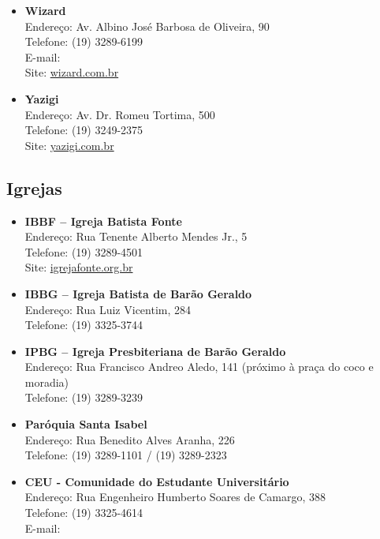 \begin{itemize}
\item \textbf{Wizard}
  \\Endereço: Av. Albino José Barbosa de Oliveira, 90
  \\Telefone: (19) 3289-6199
  \\E-mail: 
  \\Site: \url{wizard.com.br}

\item \textbf{Yazigi}
  \\Endereço: Av. Dr. Romeu Tortima, 500
  \\Telefone: (19) 3249-2375
  \\Site: \url{yazigi.com.br}
\end{itemize}

\subsection{Igrejas}

\begin{itemize}
\item \textbf{IBBF -- Igreja Batista Fonte}
  \\Endereço: Rua Tenente Alberto Mendes Jr., 5
  \\Telefone: (19) 3289-4501
  \\Site: \url{igrejafonte.org.br}

\item \textbf{IBBG -- Igreja Batista de Barão Geraldo}
  \\Endereço: Rua Luiz Vicentim, 284
  \\Telefone: (19) 3325-3744

\item \textbf{IPBG -- Igreja Presbiteriana de Barão Geraldo}
  \\Endereço: Rua Francisco Andreo Aledo, 141 (próximo à praça do coco e
  moradia)
  \\Telefone: (19) 3289-3239

\item \textbf{Paróquia Santa Isabel}
  \\Endereço: Rua Benedito Alves Aranha, 226
  \\Telefone: (19) 3289-1101 / (19) 3289-2323

\item \textbf{CEU - Comunidade do Estudante Universitário}
  \\Endereço: Rua Engenheiro Humberto Soares de Camargo, 388
  \\Telefone: (19) 3325-4614
  \\E-mail: 
\end{itemize}

